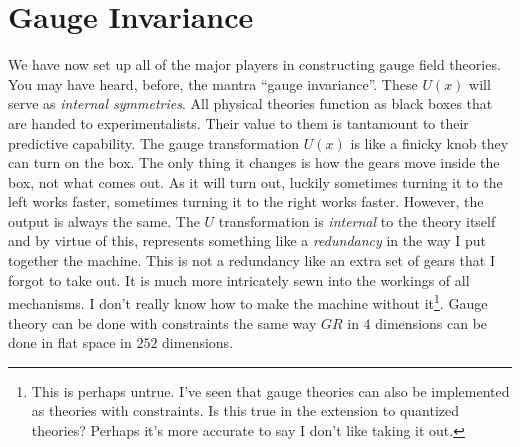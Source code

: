 \documentclass[main.tex]{subfiles}
\begin{document}
\newpage
\section{Gauge Invariance}
We have now set up all of the major players in constructing gauge field theories. You may have heard, before, the mantra ``gauge invariance''. These $U(x)$ will serve as \textit{internal symmetries}. All physical theories function as black boxes that are handed to experimentalists. Their value to them is tantamount to their predictive capability. The gauge transformation $U(x)$ is like a finicky knob they can turn on the box. The only thing it changes is how the gears move inside the box, not what comes out. As it will turn out, luckily sometimes turning it to the left works faster, sometimes turning it to the right works faster. However, the output is always the same. The $U$ transformation is \textit{internal} to the theory itself and by virtue of this, represents something like a \textit{redundancy} in the way I put together the machine. This is not a redundancy like an extra set of gears that I forgot to take out. It is much more intricately sewn into the workings of all mechanisms. I don't really know how to make the machine without it\footnote{This is perhaps untrue. I've seen that gauge theories can also be implemented as theories with constraints. Is this true in the extension to quantized theories? Perhaps it's more accurate to say I don't like taking it out.}. Gauge theory can be done with constraints the same way $GR$ in $4$ dimensions can be done in flat space in $252$ dimensions.\cite{RandArt1}
\end{document}
